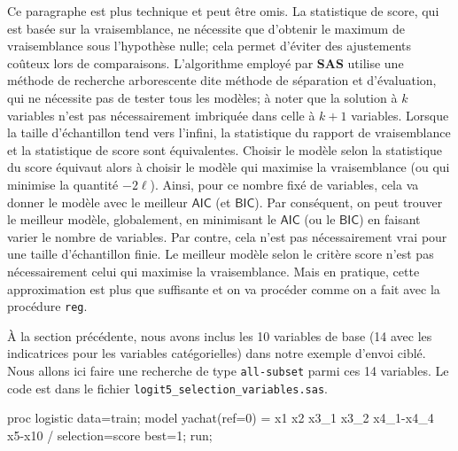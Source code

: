 \documentclass[
  11pt,
  letterpaper,
]{book}
\newenvironment{Shaded}{\begin{snugshade}}{\end{snugshade}}
\newcommand{\NormalTok}[1]{#1}
\theoremstyle{definition}
\theoremstyle{definition}
\theoremstyle{definition}
\theoremstyle{definition}
\theoremstyle{remark}
\begin{document}
Ce paragraphe est plus technique et peut être omis. La statistique de score, qui est basée sur la vraisemblance, ne nécessite que d'obtenir le maximum de vraisemblance sous l'hypothèse nulle; cela permet d'éviter des ajustements coûteux lors de comparaisons. L'algorithme employé par \textbf{SAS} utilise une méthode de recherche arborescente dite méthode de séparation et d'évaluation, qui ne nécessite pas de tester tous les modèles; à noter que la solution à \(k\) variables n'est pas nécessairement imbriquée dans celle à \(k+1\) variables. Lorsque la taille d'échantillon tend vers l'infini, la statistique du rapport de vraisemblance et la statistique de score sont équivalentes. Choisir le modèle selon la statistique du score équivaut alors à choisir le modèle qui maximise la vraisemblance (ou qui minimise la quantité \(-2 \ell\)). Ainsi, pour ce nombre fixé de variables, cela va donner le modèle avec le meilleur \(\mathsf{AIC}\) (et \(\mathsf{BIC}\)). Par conséquent, on peut trouver le meilleur modèle, globalement, en minimisant le \(\mathsf{AIC}\) (ou le \(\mathsf{BIC}\)) en faisant varier le nombre de variables. Par contre, cela n'est pas nécessairement vrai pour une taille d'échantillon finie. Le meilleur modèle selon le critère score n'est pas nécessairement celui qui maximise la vraisemblance. Mais en pratique, cette approximation est plus que suffisante et on va procéder comme on a fait avec la procédure \texttt{reg}.

À la section précédente, nous avons inclus les 10 variables de base (14 avec les indicatrices pour les variables catégorielles) dans notre exemple d'envoi ciblé. Nous allons ici faire une recherche de type \texttt{all-subset} parmi ces 14 variables. Le code est dans le fichier \texttt{logit5\_selection\_variables.sas}.

\begin{Shaded}
\begin{Highlighting}[]
\NormalTok{proc logistic data=train;}
\NormalTok{model yachat(ref=\textquotesingle{}0\textquotesingle{}) = x1 x2 x3\_1 x3\_2 x4\_1{-}x4\_4 x5{-}x10 / }
\NormalTok{  selection=score best=1;}
\NormalTok{run;}
\end{Highlighting}
\end{Shaded}
\end{document}
